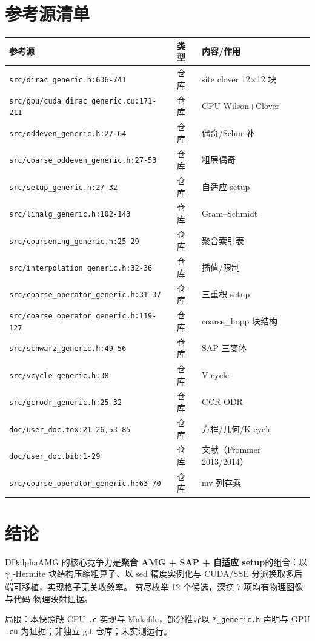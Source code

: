 \documentclass[UTF8]{ctexart}
\begin{document}
\section{参考源清单}
{\small
\begin{xltabular}{\textwidth}{XXX}
\toprule
\textcolor{evidence}{参考源} & 类型 & 内容/作用 \\
\midrule
\endhead
\texttt{\nolinkurl{src/dirac_generic.h:636-741}} & 仓库 & site clover 12$\times$12 块 \\
\texttt{\nolinkurl{src/gpu/cuda_dirac_generic.cu:171-211}} & 仓库 & GPU Wilson+Clover \\
\texttt{\nolinkurl{src/oddeven_generic.h:27-64}} & 仓库 & 偶奇/Schur 补 \\
\texttt{\nolinkurl{src/coarse_oddeven_generic.h:27-53}} & 仓库 & 粗层偶奇 \\
\texttt{\nolinkurl{src/setup_generic.h:27-32}} & 仓库 & 自适应 setup \\
\texttt{\nolinkurl{src/linalg_generic.h:102-143}} & 仓库 & Gram--Schmidt \\
\texttt{\nolinkurl{src/coarsening_generic.h:25-29}} & 仓库 & 聚合索引表 \\
\texttt{\nolinkurl{src/interpolation_generic.h:32-36}} & 仓库 & 插值/限制 \\
\texttt{\nolinkurl{src/coarse_operator_generic.h:31-37}} & 仓库 & 三重积 setup \\
\texttt{\nolinkurl{src/coarse_operator_generic.h:119-127}} & 仓库 & coarse\_hopp 块结构 \\
\texttt{\nolinkurl{src/schwarz_generic.h:49-56}} & 仓库 & SAP 三变体 \\
\texttt{\nolinkurl{src/vcycle_generic.h:38}} & 仓库 & V-cycle \\
\texttt{\nolinkurl{src/gcrodr_generic.h:25-32}} & 仓库 & GCR-ODR \\
\texttt{\nolinkurl{doc/user_doc.tex:21-26,53-85}} & 仓库 & 方程/几何/K-cycle \\
\texttt{\nolinkurl{doc/user_doc.bib:1-29}} & 仓库 & 文献（Frommer 2013/2014）\\
\texttt{\nolinkurl{src/coarse_operator_generic.h:63-70}} & 仓库 & mv 列存乘 \\
\bottomrule
\end{xltabular}
}

\section{结论}
\begin{conclbox}
DDalphaAMG 的核心竞争力是\textbf{聚合 AMG + SAP + 自适应 setup}的组合：以 $\gamma_5$-Hermite
块结构压缩粗算子、以 sed 精度实例化与 CUDA/SSE 分派换取多后端可移植，实现格子无关收敛率。
穷尽枚举 12 个候选，深挖 7 项均有物理图像与代码-物理映射证据。
\end{conclbox}
\begin{warnbox}
\textcolor{warn}{局限：}本快照缺 CPU \texttt{.c} 实现与 Makefile，部分推导以
\texttt{*\_generic.h} 声明与 GPU \texttt{.cu} 为证据；非独立 git 仓库；未实测运行。
\end{warnbox}
\end{document}
